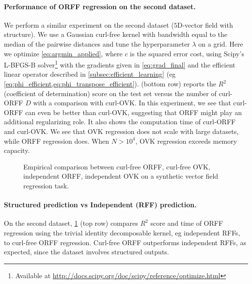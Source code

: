 \documentclass[twoside,11pt]{article}
\begin{document}
\paragraph{Performance of ORFF regression on the second dataset.}
We perform a similar experiment on the second dataset ($5$D-vector field with
structure). We use a Gaussian curl-free kernel with bandwidth equal to the
median of the pairwise distances and tune the hyperparameter $\lambda$ on a
grid. Here we optimize \cref{eq:argmin_applied}, where $c$ is the squared error
cost, using Scipy's \acs{L-BFGS-B} \citep{byrd1995limited}
solver\footnote{Available at
\url{http://docs.scipy.org/doc/scipy/reference/optimize.html}} with the
gradients given in \cref{eq:grad_final} and the efficient linear operator
described in \cref{subsec:efficient_learning} (\acs{eg}
\cref{eq:phi_efficient,eq:phi_transpose_efficient}).
 (bottom row) reports the $R^2$ (coefficient of
determination) score on the test set versus the number of curl-\acs{ORFF} $D$
with a comparison with curl-\acs{OVK}.  In this experiment, we see that
curl-\acs{ORFF} can even be better than curl-\acs{OVK}, suggesting that
\acs{ORFF} might play an additional regularizing role. It also shows the
computation time of curl-\acs{ORFF} and curl-\acs{OVK}. We see that \acs{OVK}
regression does not scale with large datasets, while \acs{ORFF} regression
does. When $N>10^4$, \acs{OVK} regression exceeds memory capacity.
\begin{figure}[t]
    \centering
    \resizebox{.85\textwidth}{!}{}
    \caption{Empirical comparison between curl-free ORFF, curl-free OVK,
    independent ORFF, independent OVK on a synthetic vector field regression
    task. \label{fig:curl_experiment}}
\end{figure}
\paragraph{Structured prediction vs Independent (RFF) prediction.}
On the second dataset, \cref{fig:curl_experiment} (top row) compares $R^2$ score
and time of \acs{ORFF} regression using the trivial identity decomposable
kernel, \acs{eg} independent \acsp{RFF}, to curl-free \acs{ORFF} regression.
Curl-free \acs{ORFF} outperforms independent \acsp{RFF}, as expected, since the
dataset involves structured outputs.
\end{document}
